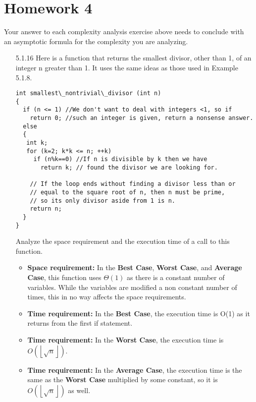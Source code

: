 \section{Homework 4}


Your answer to each complexity analysis exercise above needs to conclude with an asymptotic formula for the complexity you are analyzing.

\begin{enumerate}
\item [5.1.16] Here is a function that returns the smallest divisor, other than 1, of an integer n greater than 1. It uses the same ideas as those used in Example 5.1.8. \\
\begin{lstlisting}
int smallest\_nontrivial\_divisor (int n)
{
  if (n <= 1) //We don't want to deal with integers <1, so if
    return 0; //such an integer is given, return a nonsense answer.
  else
  {
   int k;
   for (k=2; k*k <= n; ++k)
     if (n%k==0) //If n is divisible by k then we have
       return k; // found the divisor we are looking for.

    // If the loop ends without finding a divisor less than or
    // equal to the square root of n, then n must be prime,
    // so its only divisor aside from 1 is n.
    return n;
  }
}
\end{lstlisting}
Analyze the space requirement and the execution time of a call to this function.
  \begin{itemize}
  \item \textbf{Space requirement:} In the \textbf{Best Case}, \textbf{Worst Case}, and \textbf{Average Case}, this function uses $\Theta(1)$ as there is a constant number of variables. While the variables are modified a non constant number of times, this in no way affects the space requirements.
  \item \textbf{Time requirement:} In the \textbf{Best Case}, the execution time is O(1) as it returns from the first if statement.
  \item \textbf{Time requirement:} In the \textbf{Worst Case}, the execution time is $O\left(\left\lfloor\sqrt{n}\right\rfloor\right)$.
  \item \textbf{Time requirement:} In the \textbf{Average Case}, the execution time is the same as the \textbf{Worst Case} multiplied by some constant, so it is $O\left(\left\lfloor\sqrt{n}\right\rfloor\right)$ as well.
  \end{itemize}


\end{enumerate}
